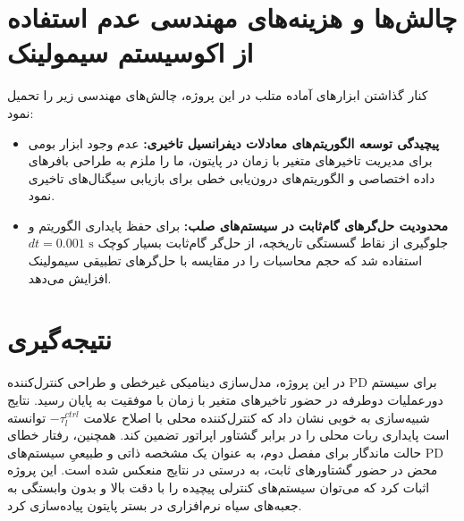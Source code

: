 \documentclass[12pt]{report}
\begin{document}
\section{چالش‌ها و هزینه‌های مهندسی عدم استفاده از اکوسیستم سیمولینک}
کنار گذاشتن ابزارهای آماده متلب در این پروژه، چالش‌های مهندسی زیر را تحمیل نمود:
\begin{itemize}
	\item \textbf{پیچیدگی توسعه الگوریتم‌های معادلات دیفرانسیل تاخیری:} عدم وجود ابزار بومی برای مدیریت تاخیرهای متغیر با زمان در پایتون، ما را ملزم به طراحی بافرهای داده اختصاصی و الگوریتم‌های درون‌یابی خطی برای بازیابی سیگنال‌های تاخیری نمود.
	\item \textbf{محدودیت حل‌گرهای گام‌ثابت در سیستم‌های صلب:} برای حفظ پایداری الگوریتم و جلوگیری از نقاط گسستگی تاریخچه، از حل‌گر گام‌ثابت بسیار کوچک \(dt=0.001 \text{ s}\) استفاده شد که حجم محاسبات را در مقایسه با حل‌گرهای تطبیقی سیمولینک افزایش می‌دهد.
\end{itemize}

\section{نتیجه‌گیری}
در این پروژه، مدل‌سازی دینامیکی غیرخطی و طراحی کنترل‌کننده PD برای سیستم دورعملیات دوطرفه در حضور تاخیرهای متغیر با زمان با موفقیت به پایان رسید. نتایج شبیه‌سازی به خوبی نشان داد که کنترل‌کننده محلی با اصلاح علامت \(-\tau_l^{ctrl}\) توانسته است پایداری ربات محلی را در برابر گشتاور اپراتور تضمین کند. همچنین، رفتار خطای حالت ماندگار برای مفصل دوم، به عنوان یک مشخصه ذاتی و طبیعیِ سیستم‌های PD محض در حضور گشتاورهای ثابت، به درستی در نتایج منعکس شده است. این پروژه اثبات کرد که می‌توان سیستم‌های کنترلی پیچیده را با دقت بالا و بدون وابستگی به جعبه‌های سیاه نرم‌افزاری در بستر پایتون پیاده‌سازی کرد.
\end{document}
